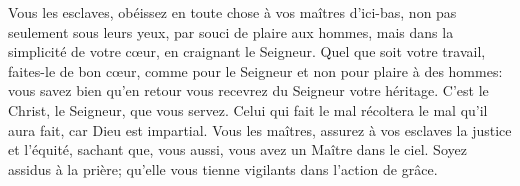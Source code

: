 Vous les esclaves, obéissez en toute chose à vos maîtres d’ici-bas,
	non pas seulement sous leurs yeux, par souci de plaire aux hommes,
	mais dans la simplicité de votre cœur, en craignant le Seigneur.
Quel que soit votre travail, faites-le de bon cœur,
	comme pour le Seigneur et non pour plaire à des hommes:
	vous savez bien qu’en retour vous recevrez du Seigneur votre héritage.
C’est le Christ, le Seigneur, que vous servez.
Celui qui fait le mal récoltera le mal qu’il aura fait, car Dieu est impartial.
Vous les maîtres, assurez à vos esclaves la justice et l’équité,
	sachant que, vous aussi, vous avez un Maître dans le ciel.
Soyez assidus à la prière; qu’elle vous tienne vigilants dans l’action de grâce.
